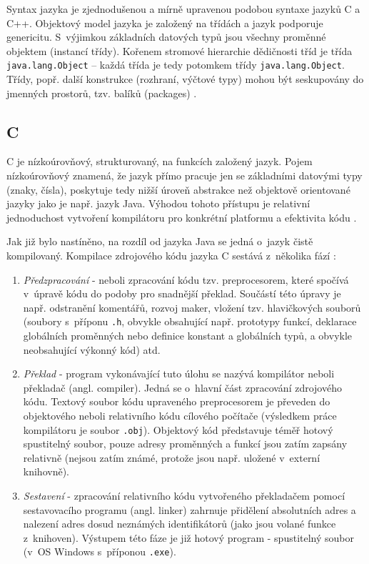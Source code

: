 \documentclass[onepage, a4paper, 12pt]{bakalarka}
\begin{document}
Syntax jazyka je zjednodušenou a mírně upravenou podobou syntaxe jazyků C a C++. Objektový model jazyka je založený na třídách a jazyk podporuje genericitu. S~výjimkou základních datových typů jsou všechny proměnné objektem (instancí třídy). Kořenem stromové hierarchie dědičnosti tříd je třída \texttt{java.lang.Object} – každá třída je tedy potomkem třídy \texttt{java.lang.Object}. Třídy, popř. další konstrukce (rozhraní, výčtové typy) mohou být seskupovány do jmenných prostorů, tzv. balíků (packages) \cite{java-book, java-guide-object}.\par

\subsection{C}
C je nízkoúrovňový, strukturovaný, na funkcích založený jazyk. Pojem nízkoúrovňový znamená, že jazyk přímo pracuje jen se základními datovými typy (znaky, čísla), poskytuje tedy nižší úroveň abstrakce než objektově orientované jazyky jako je např. jazyk Java. Výhodou tohoto přístupu je relativní jednoduchost vytvoření kompilátoru pro konkrétní platformu a efektivita kódu \cite{c-book, c-guide}.\par
Jak již bylo nastíněno, na rozdíl od jazyka Java se jedná o~jazyk čistě kompilovaný. Kompilace zdrojového kódu jazyka C sestává z~několika fází \cite{c-book, c-guide}:
\begin{enumerate}
\item \textit{Předzpracování} - neboli zpracování kódu tzv. preprocesorem, které spočívá v~úpravě kódu do podoby pro snadnější překlad. Součástí této úpravy je např. odstranění komentářů, rozvoj maker, vložení tzv. hlavičkových souborů (soubory s~příponu \texttt{.h}, obvykle obsahující např. prototypy funkcí, deklarace globálních proměnných nebo definice konstant a globálních typů, a obvykle neobsahující výkonný kód) atd.
\item \textit{Překlad} - program vykonávající tuto úlohu se nazývá kompilátor neboli překladač (angl. compiler). Jedná se o~hlavní část zpracování zdrojového kódu. Textový soubor kódu upraveného preprocesorem je převeden do objektového neboli relativního kódu cílového počítače (výsledkem práce kompilátoru je soubor \texttt{.obj}). Objektový kód představuje téměř hotový spustitelný soubor, pouze adresy proměnných a funkcí jsou zatím zapsány relativně (nejsou zatím známé, protože jsou např. uložené v~externí knihovně).
\item \textit{Sestavení} - zpracování relativního kódu vytvořeného překladačem pomocí sestavovacího programu (angl. linker) zahrnuje přidělení absolutních adres a nalezení adres dosud neznámých identifikátorů (jako jsou volané funkce z~knihoven). Výstupem této fáze je již hotový program - spustitelný soubor (v~OS Windows s~příponou \texttt{.exe}).
\end{enumerate}\par\noindent
\end{document}
